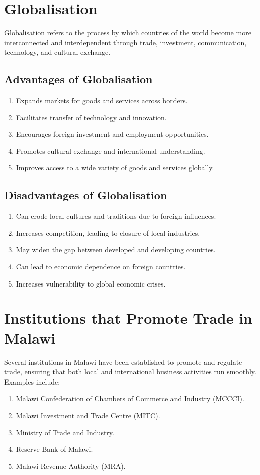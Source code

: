 \documentclass[12pt,a4paper, openany]{book}
\begin{document}
\section{Globalisation}
Globalisation refers to the process by which countries of the world become more interconnected and interdependent
through trade, investment, communication, technology, and cultural exchange.

\subsection{Advantages of Globalisation}
\begin{enumerate}
	\item Expands markets for goods and services across borders.
	\item Facilitates transfer of technology and innovation.
	\item Encourages foreign investment and employment opportunities.
	\item Promotes cultural exchange and international understanding.
	\item Improves access to a wide variety of goods and services globally.
\end{enumerate}

\subsection{Disadvantages of Globalisation}
\begin{enumerate}
	\item Can erode local cultures and traditions due to foreign influences.
	\item Increases competition, leading to closure of local industries.
	\item May widen the gap between developed and developing countries.
	\item Can lead to economic dependence on foreign countries.
	\item Increases vulnerability to global economic crises.
\end{enumerate}

\section{Institutions that Promote Trade in Malawi}
Several institutions in Malawi have been established to promote and regulate trade,
ensuring that both local and international business activities run smoothly.
Examples include:
\begin{enumerate}
	\item Malawi Confederation of Chambers of Commerce and Industry (MCCCI).
	\item Malawi Investment and Trade Centre (MITC).
	\item Ministry of Trade and Industry.
	\item Reserve Bank of Malawi.
	\item Malawi Revenue Authority (MRA).
\end{enumerate}
\end{document}
